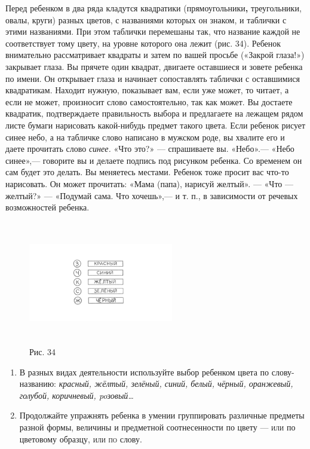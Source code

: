 \documentclass{book}
\renewcommand{\emph}[1]{\textit{#1}}
\begin{document}
Перед ребенком в два ряда кладутся квадратики (прямоугольники\textbf{,}
треугольники, овалы, круги) разных цветов, с названиями которых он
знаком, и таблички с этими названиями. При этом таблички перемешаны так,
что название каждой не соответствует тому цвету, на уровне которого она
лежит (рис. 34). Ребенок внимательно рассматривает квадраты и затем по
вашей просьбе («Закрой глаза!») закрывает глаза. Вы прячете один
квадрат, двигаете оставшиеся и зовете ребенка по имени. Он открывает
глаза и начинает сопоставлять таблички с оставшимися квадратикам.
Находит нужную, показывает вам, если уже может, то читает, а если не
может, произносит слово самостоятельно, так как может. Вы достаете
квадратик, подтверждаете правильность выбора и предлагаете на лежащем
рядом листе бумаги нарисовать какой-нибудь предмет такого цвета. Если
ребенок рисует синее небо, а на табличке слово написано в мужском роде,
вы хвалите его и даете прочитать слово \emph{синее.} «Что это?» ---
спрашиваете вы. «Небо».--- «Небо синее»,--- говорите вы и делаете
подпись под рисунком ребенка. Со временем он сам будет это делать. Вы
меняетесь местами. Ребенок тоже просит вас что-то нарисовать. Он может
прочитать: «Мама (папа), нарисуй желтый». --- «Что --- желтый?» ---
«Подумай сама. Что хочешь»,--- и т. п., в зависимости от речевых
возможностей ребенка.

\begin{figure}
\centering
\includegraphics[width=2.4855in,height=2.12308in]{media/media/image31.png}
\caption*{Рис. 34}
\end{figure}


\begin{enumerate}
\def\labelenumi{\arabic{enumi}.}
\setcounter{enumi}{1}
\item
  
  В разных видах деятельности используйте выбор ребенком цвета по
  слову-названию: \emph{красный, жёлтый, зелёный, синий, белый, чёрный,
  оранжевый, голубой, коричневый, poзовый\ldots{}}
  
\item
  
  Продолжайте упражнять ребенка в умении группировать различные предметы
  разной формы, величины и предметной соотнесенности по цвету ---
  \textsc{или} по цветовому образцу, \textsc{или по} слову.
  
\end{enumerate}
\end{document}
